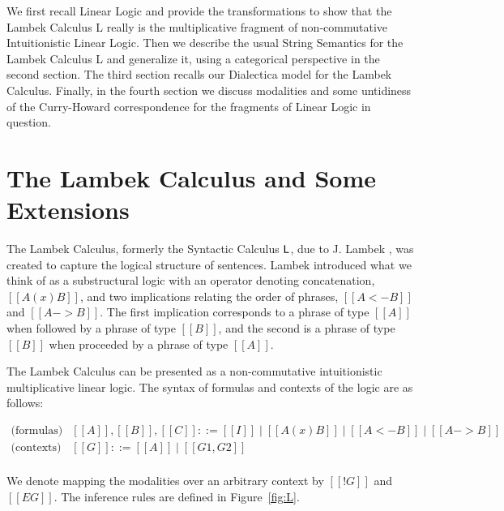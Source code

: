 \documentclass{article}
\begin{document}

We first recall Linear Logic and provide the transformations to show
that the Lambek Calculus \textsf{L} really is the multiplicative
fragment of non-commutative Intuitionistic Linear Logic.  Then we
describe the usual String Semantics for the Lambek Calculus \textsf{L}
and generalize it, using a categorical perspective in the second
section.  The third section recalls our Dialectica model for the
Lambek Calculus.  Finally, in the fourth section we discuss modalities
and some untidiness of the Curry-Howard correspondence for the
fragments of Linear Logic in question.

\section{The Lambek Calculus and Some Extensions}

The Lambek Calculus, formerly the Syntactic Calculus $\sf L$, due to
J.  Lambek \cite{Lambek1958}, was created to capture the logical
structure of sentences.  Lambek introduced what we think of as a
substructural logic with an operator denoting concatenation,
$[[A (x) B]]$, and two implications relating the order of phrases,
$[[A <- B]]$ and $[[A -> B]]$.  The first implication corresponds to a
phrase of type $[[A]]$ when followed by a phrase of type $[[B]]$, and
the second is a phrase of type $[[B]]$ when proceeded by a phrase of
type $[[A]]$.

The Lambek Calculus can be presented as a
non-commutative intuitionistic multiplicative linear logic.  The
syntax of formulas and contexts of the logic are as follows:

\[
\begin{array}{lll}
  \text{(formulas)} & [[A]],[[B]],[[C]] ::= [[I]] \mid [[A (x) B]] \mid [[A <- B]] \mid [[A -> B]]\\
  \text{(contexts)} & [[G]] ::= [[A]] \mid [[G1,G2]]\\
\end{array}
\]

We denote mapping the modalities over an arbitrary context by $[[!{ G
}]]$ and $[[E{ G }]]$.  The inference rules are defined in
Figure~\ref{fig:L}.
\end{document}
